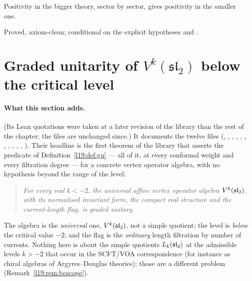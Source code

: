 \begin{physics}
Positivity in the bigger theory, sector by sector, gives positivity in the smaller one.
\end{physics}

\begin{status}
Proved, axiom-clean; conditional on the explicit hypotheses  and .
\end{status}

\section{Graded unitarity of \texorpdfstring{$V^k(\mathfrak{sl}_2)$}{V\textasciicircum k(sl(2))} below the critical level}\label{l19:sec:belowcritical}

\paragraph{What this section adds.} (Its Lean quotations were taken at a later revision of the library than the rest of the
chapter; the files are unchanged since.) It documents the twelve files
 (, ,
, , , ,
, , , ,
, ). Their headline is the first theorem of the library that asserts
the predicate  of Definition~\ref{l19:def:gu} --- all of it, at every conformal weight
and every filtration degree --- for a concrete vertex operator algebra, with no hypothesis beyond the range of
the level:

\begin{quote}
\emph{For every real $k<-2$, the universal affine vertex operator algebra $V^k(\mathfrak{sl}_2)$, with its normalised
invariant form, the compact real structure and the current-length flag, is graded unitary.}
\end{quote}

The algebra is the \emph{universal} one, $V^k(\mathfrak{sl}_2)$, not a simple quotient; the level is \emph{below}
the critical value $-2$; and the flag is the \emph{ordinary} length filtration by number of currents.
Nothing here is about the simple quotients $L_k(\mathfrak{sl}_2)$ at the admissible levels $k>-2$ that occur in
the SCFT/VOA correspondence (for instance as chiral algebras of Argyres--Douglas theories); those are a different problem
(Remark~\ref{l19:rem:bcscope}).

